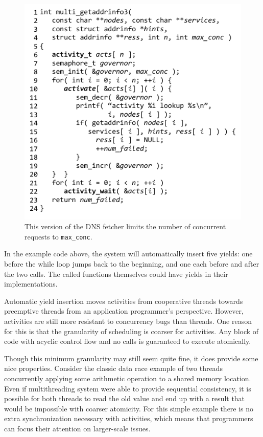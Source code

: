 \documentclass[9pt,preprint]{sigplanconf}
\begin{document}
\begin{figure}
\includegraphics{multi_getaddrinfo_sem}
\caption{This version of the DNS fetcher limits the number of concurrent requests to \texttt{max\_conc}.}
\label{fig:charcoal_multidns_sem}
\end{figure}

In the example code above, the system will automatically insert five yields: one before the while loop jumps back to the beginning, and one each before and after the two calls.
The called functions themselves could have yields in their implementations.

Automatic yield insertion moves activities from cooperative threads towards preemptive threads from an application programmer's perspective.
However, activities are still more resistant to concurrency bugs than threads.
One reason for this is that the granularity of scheduling is coarser for activities.
Any block of code with acyclic control flow and no calls is guaranteed to execute atomically.

Though this minimum granularity may still seem quite fine, it does provide some nice properties.
Consider the classic data race example of two threads concurrently applying some arithmetic operation to a shared memory location.
Even if multithreading system were able to provide sequential consistency, it is possible for both threads to read the old value and end up with a result that would be impossible with coarser atomicity.
For this simple example there is no extra synchronization necessary with activities, which means that programmers can focus their attention on larger-scale issues.
\end{document}
